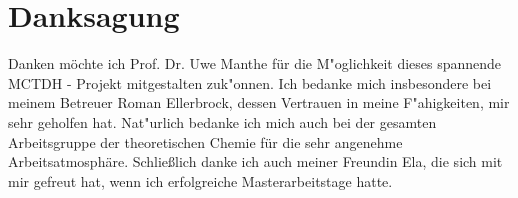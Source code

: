 \chapter{Danksagung}
Danken m\"ochte ich Prof. Dr. Uwe Manthe f\"ur die M"oglichkeit dieses spannende MCTDH - Projekt mitgestalten zuk"onnen.
Ich bedanke mich insbesondere bei meinem Betreuer Roman Ellerbrock, dessen Vertrauen in meine F"ahigkeiten, mir sehr geholfen hat. Nat"urlich bedanke ich mich auch bei der gesamten Arbeitsgruppe der theoretischen Chemie f\"ur die sehr angenehme Arbeitsatmosph\"are.
Schlie\ss{}lich danke ich auch meiner Freundin Ela, die sich mit mir gefreut hat, wenn ich erfolgreiche Masterarbeitstage hatte.
